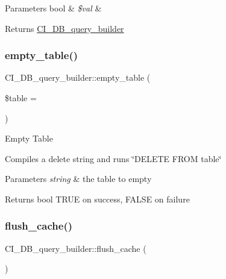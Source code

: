 \begin{DoxyParams}[1]{Parameters}
bool & {\em \$val} & \\
\hline
\end{DoxyParams}
\begin{DoxyReturn}{Returns}
\mbox{\hyperlink{class_c_i___d_b__query__builder}{C\+I\+\_\+\+D\+B\+\_\+query\+\_\+builder}} 
\end{DoxyReturn}
\mbox{\label{class_c_i___d_b__query__builder_a6823e3af5bf02510ed025efb607a967c}} 
\subsubsection{\texorpdfstring{empty\+\_\+table()}{empty\_table()}}
{\footnotesize\ttfamily C\+I\+\_\+\+D\+B\+\_\+query\+\_\+builder\+::empty\+\_\+table (\begin{DoxyParamCaption}\item[{}]{\$table = {\ttfamily \textquotesingle{}\textquotesingle{}} }\end{DoxyParamCaption})}

Empty Table

Compiles a delete string and runs \char`\"{}\+D\+E\+L\+E\+T\+E F\+R\+O\+M table\char`\"{}


\begin{DoxyParams}{Parameters}
{\em string} & the table to empty \\
\hline
\end{DoxyParams}
\begin{DoxyReturn}{Returns}
bool T\+R\+UE on success, F\+A\+L\+SE on failure 
\end{DoxyReturn}
\mbox{\label{class_c_i___d_b__query__builder_abe4a3c6eb41e9108caac0182239b1e6e}} 
\subsubsection{\texorpdfstring{flush\+\_\+cache()}{flush\_cache()}}
{\footnotesize\ttfamily C\+I\+\_\+\+D\+B\+\_\+query\+\_\+builder\+::flush\+\_\+cache (\begin{DoxyParamCaption}{ }\end{DoxyParamCaption})}

